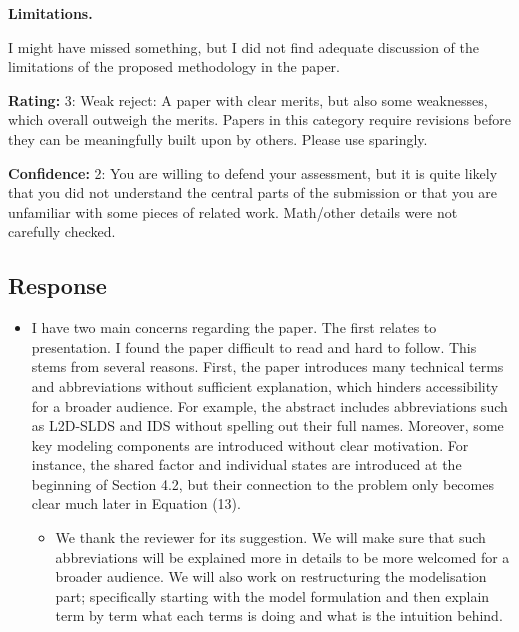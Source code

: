 \textbf{Limitations.}

I might have missed something, but I did not find adequate discussion of the limitations of the proposed methodology in the paper.

\textbf{Rating:} 3: Weak reject: A paper with clear merits, but also some weaknesses, which overall outweigh the merits. Papers in this category require revisions before they can be meaningfully built upon by others. Please use sparingly.

\textbf{Confidence:} 2: You are willing to defend your assessment, but it is quite likely that you did not understand the central parts of the submission or that you are unfamiliar with some pieces of related work. Math/other details were not carefully checked.


\subsection{Response}
\begin{itemize}
    \item I have two main concerns regarding the paper. The first relates to presentation. I found the paper difficult to read and hard to follow. This stems from several reasons. First, the paper introduces many technical terms and abbreviations without sufficient explanation, which hinders accessibility for a broader audience. For example, the abstract includes abbreviations such as L2D-SLDS and IDS without spelling out their full names. Moreover, some key modeling components are introduced without clear motivation. For instance, the shared factor and individual states are introduced at the beginning of Section 4.2, but their connection to the problem only becomes clear much later in Equation (13).
    \begin{itemize}
        \item We thank the reviewer for its suggestion. We will make sure that such abbreviations will be explained
        more in details to be more welcomed for a broader audience. We will also work on restructuring the
        modelisation part; specifically starting with the model formulation and then explain term by term what each
        terms is doing and what is the intuition behind.
    \end{itemize}
\end{itemize}





